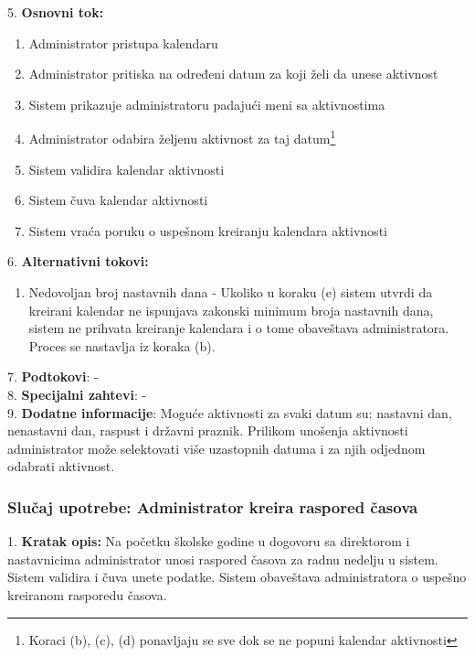 \documentclass{article}
\begin{document}
5. \textbf{Osnovni tok:} 
\begin{enumerate} [label=(\alph*)]
\item Administrator pristupa kalendaru
\item Administrator pritiska na određeni datum za koji želi da unese aktivnost
\item Sistem prikazuje administratoru padajući meni sa aktivnostima
\item Administrator odabira željenu aktivnost za taj datum\footnote{Koraci (b), (c), (d) ponavljaju se sve dok se ne popuni kalendar aktivnosti}
\item Sistem validira kalendar aktivnosti
\item Sistem čuva kalendar aktivnosti
\item Sistem vraća poruku o uspešnom kreiranju kalendara aktivnosti
\end{enumerate}

6. \textbf{Alternativni tokovi:}
\begin{enumerate} [label=(\roman*)]
\item Nedovoljan broj nastavnih dana - Ukoliko u koraku (e) sistem utvrdi da kreirani kalendar ne ispunjava zakonski minimum broja nastavnih dana, sistem ne prihvata kreiranje kalendara i o tome obaveštava administratora. Proces se nastavlja iz koraka (b).
\end{enumerate}

7. \textbf{Podtokovi}:  - \\

8. \textbf{Specijalni zahtevi}: - \\

9. \textbf{Dodatne informacije}: Moguće aktivnosti za svaki datum su: nastavni dan, nenastavni dan, raspust i državni praznik. Prilikom unošenja aktivnosti administrator može selektovati više uzastopnih datuma i za njih odjednom odabrati aktivnost. \\


\subsubsection{Slučaj upotrebe: Administrator kreira raspored časova}
1. \textbf{Kratak opis:} Na početku školske godine u dogovoru sa direktorom i nastavnicima administrator unosi raspored časova za radnu nedelju u sistem. Sistem validira i čuva unete podatke. Sistem obaveštava administratora o uspešno kreiranom rasporedu časova. \\ 
\end{document}

